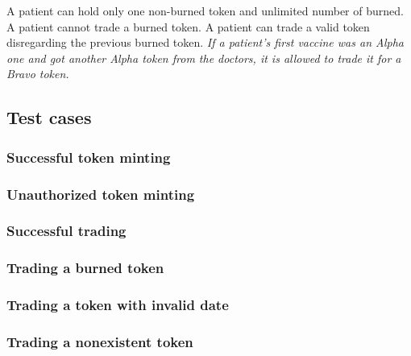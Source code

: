 A patient can hold only one non-burned token and unlimited number of burned. A patient cannot trade a burned token.
A patient can trade a valid token disregarding the previous burned token. \emph{If a patient's first vaccine was an Alpha one and got another Alpha token from the doctors, it is allowed to trade it for a Bravo token.}



\subsection{Test cases}

\subsubsection{Successful token minting}
\subsubsection{Unauthorized token minting}
\subsubsection{Successful trading}
\subsubsection{Trading a burned token}
\subsubsection{Trading a token with invalid date}
\subsubsection{Trading a nonexistent token}